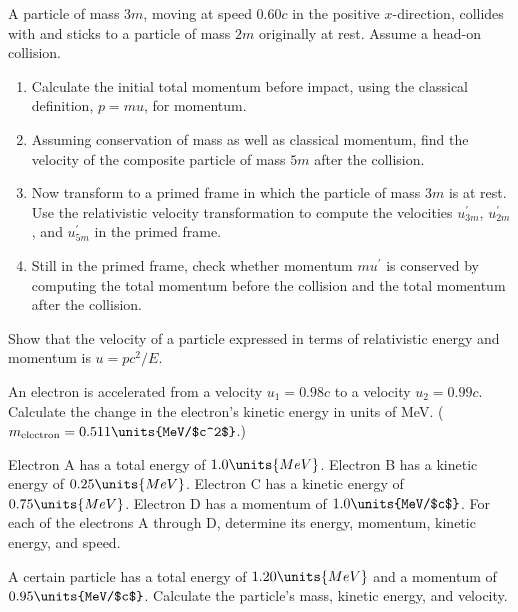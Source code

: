 \newpage
\begin{problem}
A particle of mass $3m$, moving at speed $0.60c$ in the positive
$x$-direction, collides with and sticks to a particle of mass $2m$
originally at rest.  Assume a head-on collision.
\begin{enumerate}
\item Calculate the initial total momentum before impact, using the
classical definition, $p = mu$, for momentum. 
\item Assuming conservation of mass as well as classical momentum,
find the velocity of the composite particle of mass $5m$ after the
collision.  
\item Now transform to a primed frame in which the particle of mass
$3m$ is at rest.  Use the relativistic velocity transformation to
compute the velocities $u^\prime_{3m}$, $u^\prime_{2m}$, and
$u^\prime_{5m}$ in the primed frame. 
\item Still in the primed frame, check whether momentum $mu^\prime$ is
conserved by computing the total momentum before the collision and the
total momentum after the collision.
\end{enumerate}
\label{prob:inelastic}
\end{problem}


\begin{problem}
Show that the velocity of a particle expressed in terms of
relativistic energy and momentum is $u = pc^2/E$.
\label{prob:rel-u-p-e}
\end{problem}


\begin{problem}
An electron is accelerated from a velocity $u_1 = 0.98c$ to a velocity
$u_2 = 0.99c$.  Calculate the change in the electron's kinetic energy in
units of MeV.  ($m_{\rm electron} = 0.511\units{MeV/$c^2$}$.)
\label{prob:energy-to-accelerate}
\end{problem}

\begin{problem}
Electron A has a total energy of $1.0\units{MeV}$.  Electron B has a
kinetic energy of $0.25\units{MeV}$.  Electron C has a kinetic energy of
$0.75\units{MeV}$.  Electron D has a momentum of $1.0\units{MeV/$c$}$.
For each of the electrons A through D, determine its energy, momentum,
kinetic energy, and speed.
\label{prob:electrons}
\end{problem}

\begin{problem}
A certain particle has a total energy of $1.20\units{MeV}$ and
a momentum of $0.95\units{MeV/$c$}$.  Calculate the particle's mass,
kinetic energy, and velocity.  
\end{problem}

